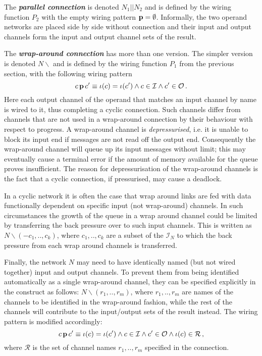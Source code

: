 \documentclass[11pt]{report}
\begin{document}
The \textbf{\emph{ parallel connection}} is denoted $N_1||N_2$ and is defined by the wiring function $P_2$ with the empty wiring pattern ${\bf p}=\emptyset$. Informally, the two operand networks are placed side by side without connection and their input and output channels form
the input and output channel sets of the result.

The \textbf{\emph{ wrap-around connection}} has more than one version. The simpler version is denoted $N\backslash$ and is defined by the wiring function $P_1$ from the previous section, with the following wiring pattern
\[
c\,\hbox{\bf p}\,c^\prime \equiv \iota(c)=\iota(c^\prime) \wedge c\in\mathcal{I}\wedge c^\prime\in \mathcal{O}\,.
\]
Here each output channel of the operand that matches an input channel by name is wired to it, thus completing a cyclic connection.
Such channels differ from channels that are not used in a wrap-around connection by their behaviour with respect to progress. A wrap-around channel is {\em depressurised}, i.e. it is unable to block its input end if messages are not read off the output end. Consequently the wrap-around channel will queue up its input messages without limit; this may eventually cause a terminal error if the amount of memory available for the queue proves insufficient. The reason for depressurisation of the wrap-around channels is the fact that  a cyclic connection, if pressurised, may cause a deadlock.

In a cyclic network it is often the case that wrap around links are fed with data functionally dependent on  specific input (not wrap-around) channels. In such circumstances the growth of the queue in a wrap around channel could be limited by transferring the back pressure over to
such input channels. This is written as $N\backslash(-c_1,..,c_k)$, where $c_1,..,c_k$ are a subset of the $\mathcal{I}_N$ to which the back pressure from each wrap around channels is transferred.

Finally, the network $N$ may need to have identically named (but not wired together) input and output channels. To prevent them from being identified automatically as a single wrap-around channel, they can be specified explicitly in the construct as follows:  $N\backslash(r_1,..,r_m)$, where $r_1,..,r_m$ are names of the channels to be identified in the wrap-around fashion, while the rest of the channels will contribute to the input/output sets of the result instead. The wiring pattern is modified accordingly:
\[
c\,\hbox{\bf p}\,c^\prime \equiv \iota(c)=\iota(c^\prime) \wedge c\in\mathcal{I}\wedge c^\prime\in \mathcal{O}\wedge \iota(c)\in\mathcal{R}\,,
\]
where $\mathcal{R}$ is the set of channel names $r_1,..,r_m$ specified in the connection.
\end{document}

